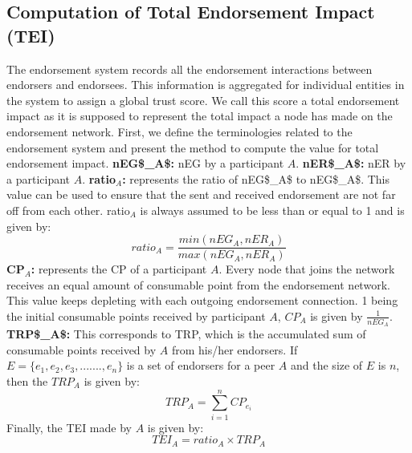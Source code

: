 \subsection{Computation of Total Endorsement Impact (TEI)} 
The endorsement system records all the endorsement interactions between
endorsers and endorsees. This information is aggregated for individual entities
in the system to assign a global trust score. We call this score a total
endorsement impact as it is supposed to represent the total impact a node has
made on the endorsement network. First, we define the terminologies related to
the endorsement system and present the method to compute the value for total
endorsement impact.\newline 
\textbf{{\acrshort{nEG$_A$:}}} \ac{nEG} by a participant $A$. \newline
\textbf{{\acrshort{nER$_A$:}}} \ac{nER} by a participant $A$. \newline
\textbf{ratio$_A$:} represents the ratio of \acrshort{nEG$_A$} to
\acrshort{nEG$_A$}. This value can be used to ensure that the sent and received
endorsement are not far off from each other. ratio$_{A}$ is always assumed to
be less than or equal to 1 and is given by:   
\begin{equation}
	ratio_A = \frac{min(nEG_A, nER_A)}{max(nEG_A, nER_A)}
\end{equation}
\textbf{\acrshort{CP}$_A$:} represents the \ac{CP} of a participant $A$. Every
node that joins the network receives an equal amount of consumable point from
the endorsement network. This value keeps depleting with each outgoing
endorsement connection. 1 being the initial consumable points received by
participant $A$, $CP_{A}$ is given by $\frac{1}{nEG_A}$.\newline
\textbf{\acrshort{TRP$_A$}:} This corresponds to \ac{TRP}, which is the
accumulated sum of consumable points received by $A$ from his/her endorsers.
\newline
If $E = \{e_{1}, e_{2}, e_{3}, ......., e_{n}\}$ is a set of endorsers for a
peer $A$ and the size of $E$ is $n$, then the $TRP_{A}$ is given by:
\begin{equation}
	TRP_A = \sum_{i=1}^{n}CP_{e_{i}}
\end{equation}
Finally, the \ac{TEI} made by $A$ is given by: 
\begin{equation}
	TEI_A = ratio_A \times TRP_A
\end{equation}
